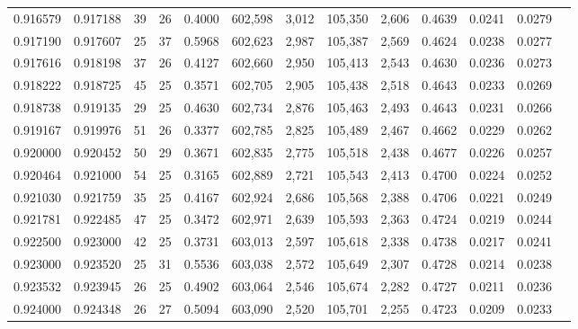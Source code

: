 \begin{tabular}{rrrrrrrrrrrrr}
0.916579 & 0.917188 &    39 &  26 &                                     0.4000 & 602,598 &   3,012 & 105,350 &   2,606 & 0.4639 & 0.0241 & 0.0279 \\
0.917190 & 0.917607 &    25 &  37 &                                     0.5968 & 602,623 &   2,987 & 105,387 &   2,569 & 0.4624 & 0.0238 & 0.0277 \\
0.917616 & 0.918198 &    37 &  26 &                                     0.4127 & 602,660 &   2,950 & 105,413 &   2,543 & 0.4630 & 0.0236 & 0.0273 \\
0.918222 & 0.918725 &    45 &  25 &                                     0.3571 & 602,705 &   2,905 & 105,438 &   2,518 & 0.4643 & 0.0233 & 0.0269 \\
0.918738 & 0.919135 &    29 &  25 &                                     0.4630 & 602,734 &   2,876 & 105,463 &   2,493 & 0.4643 & 0.0231 & 0.0266 \\
0.919167 & 0.919976 &    51 &  26 &                                     0.3377 & 602,785 &   2,825 & 105,489 &   2,467 & 0.4662 & 0.0229 & 0.0262 \\
0.920000 & 0.920452 &    50 &  29 &                                     0.3671 & 602,835 &   2,775 & 105,518 &   2,438 & 0.4677 & 0.0226 & 0.0257 \\
0.920464 & 0.921000 &    54 &  25 &                                     0.3165 & 602,889 &   2,721 & 105,543 &   2,413 & 0.4700 & 0.0224 & 0.0252 \\
0.921030 & 0.921759 &    35 &  25 &                                     0.4167 & 602,924 &   2,686 & 105,568 &   2,388 & 0.4706 & 0.0221 & 0.0249 \\
0.921781 & 0.922485 &    47 &  25 &                                     0.3472 & 602,971 &   2,639 & 105,593 &   2,363 & 0.4724 & 0.0219 & 0.0244 \\
0.922500 & 0.923000 &    42 &  25 &                                     0.3731 & 603,013 &   2,597 & 105,618 &   2,338 & 0.4738 & 0.0217 & 0.0241 \\
0.923000 & 0.923520 &    25 &  31 &                                     0.5536 & 603,038 &   2,572 & 105,649 &   2,307 & 0.4728 & 0.0214 & 0.0238 \\
0.923532 & 0.923945 &    26 &  25 &                                     0.4902 & 603,064 &   2,546 & 105,674 &   2,282 & 0.4727 & 0.0211 & 0.0236 \\
0.924000 & 0.924348 &    26 &  27 &                                     0.5094 & 603,090 &   2,520 & 105,701 &   2,255 & 0.4723 & 0.0209 & 0.0233 \\

\end{tabular}
